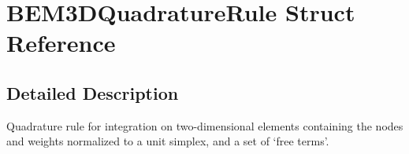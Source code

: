 \section{B\+E\+M3\+D\+Quadrature\+Rule Struct Reference}
\label{structBEM3DQuadratureRule}


\subsection{Detailed Description}
Quadrature rule for integration on two-\/dimensional elements containing the nodes and weights normalized to a unit simplex, and a set of `free terms'. 